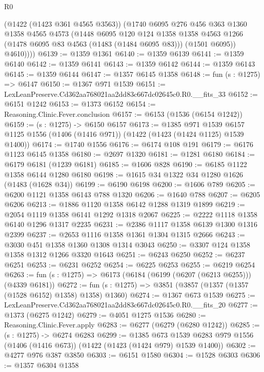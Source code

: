 \begin{lexlean}{R0}
\begin{coremodule}
          (@1422 (@1423 @361 @4565 @3563))
          (@1740
            @6095
            @276
            @456
            @363
            @1360
            @1358
            @4565
            @4573
            (@1448
              @6095
              @120
              @124
              @1358
              @1358
              @4563
              @1266
              (@1478 @6095 @83 @4563 (@1483 (@1484 @6095 @83)))
              (@1501 @6095))
            @4610))))
@6139 := @1359 @1361
@6140 := @1359 @6139
@6141 := @1359 @6140
@6142 := @1359 @6141
@6143 := @1359 @6142
@6144 := @1359 @6143
@6145 := @1359 @6144
@6147 := @1357 @6145 @1358
@6148 := fun (s : @1275) => @6147
@6150 := @1367 @971 @1539
@6151 := LexLeanPreserve.Cd362aa768021aa2dd83c667dc02645c0.R0.__fits_33
@6152 := @6151 @1242
@6153 := @1373 @6152
@6154 := Reasoning.Clinic.Fever.conclusion
@6157 := @6153 (@1536 (@6154 @1242))
@6159 := (s : @1275) -> @6150 @6157
@6173 := @1385
    @971
    @1539
    @6157
    @1125
    @1556
    (@1406 (@1416 @971))
    (@1422 (@1423 (@1424 @1125) @1539 @1400))
@6174 := @1740 @1556
@6176 := @6174 @108 @191
@6179 := @6176 @1123 @6145 @1358
@6180 := @2697 @1320
@6181 := @1281 @6180
@6184 := @6179 @6181 (@1239 @6181)
@6185 := @1606 @828
@6190 := @6185 @1122 @1358 @6144 @1280 @6180
@6198 := @1615 @34 @1322 @34 @1280 @1626 (@1483 (@1628 @34))
@6199 := @6190 @6198
@6200 := @1606 @789
@6205 := @6200 @1121 @1358 @6143 @788 @1320
@6206 := @1640 @788
@6207 := @6205 @6206
@6213 := @1886 @1120 @1358 @6142 @1288 @1319 @1899
@6219 := @2054 @1119 @1358 @6141 @1292 @1318 @2067
@6225 := @2222 @1118 @1358 @6140 @1296 @1317 @2235
@6231 := @2386 @1117 @1358 @6139 @1300 @1316 @2399
@6237 := @2653 @1116 @1358 @1361 @1304 @1315 @2666
@6243 := @3030 @451 @1358 @1360 @1308 @1314 @3043
@6250 := @3307 @124 @1358 @1358 @1312 @1266 @3320 @1643
@6251 := @6243 @6250
@6252 := @6237 @6251
@6253 := @6231 @6252
@6254 := @6225 @6253
@6255 := @6219 @6254
@6263 := fun (s : @1275) => @6173 (@6184 (@6199 (@6207 (@6213 @6255))) (@4339 @6181))
@6272 := fun (s : @1275) => @3851 (@3857 (@1357 (@1357 (@1528 @6152) @1358) @1358) @1360)
@6274 := @1367 @673 @1539
@6275 := LexLeanPreserve.Cd362aa768021aa2dd83c667dc02645c0.R0.__fits_20
@6277 := @1373 (@6275 @1242)
@6279 := @4051 @1275 @1536
@6280 := Reasoning.Clinic.Fever.apply
@6283 := @6277 (@6279 (@6280 @1242))
@6285 := (s : @1275) -> @6274 @6283
@6299 := @1385
    @673
    @1539
    @6283
    @979
    @1556
    (@1406 (@1416 @673))
    (@1422 (@1423 (@1424 @979) @1539 @1400))
@6302 := @4277 @976 @387 @3850
@6303 := @6151 @1580
@6304 := @1528 @6303
@6306 := @1357 @6304 @1358

\end{coremodule}
\end{lexlean}

